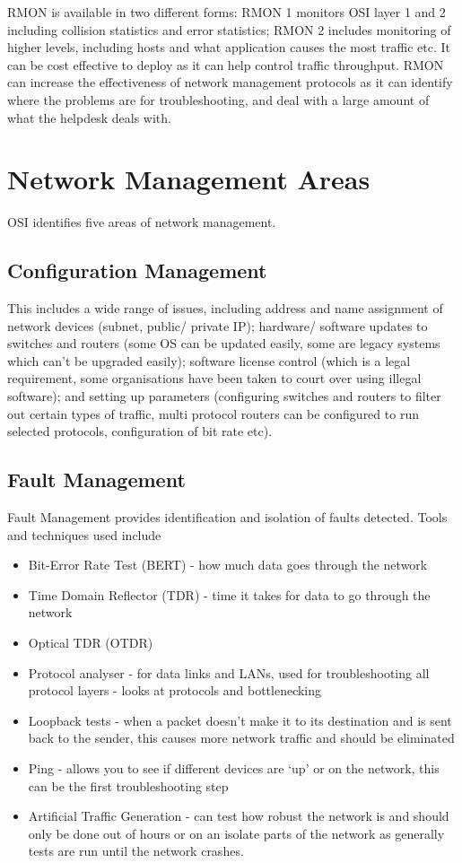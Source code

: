 RMON is available in two different forms: RMON 1 monitors OSI layer 1 and 2 including collision statistics and error statistics; RMON 2 includes monitoring of higher levels, including hosts and what application causes the most traffic etc. It can be cost effective to deploy as it can help control traffic throughput. RMON can increase the effectiveness of network management protocols as it can identify where the problems are for troubleshooting, and deal with a large amount of what the helpdesk deals with. 

\section*{Network Management Areas}
OSI identifies five areas of network management.
\subsection*{Configuration Management}
This includes a wide range of issues, including address and name assignment of network devices (subnet, public/ private IP); hardware/ software updates to switches and routers (some OS can be updated easily, some are legacy systems which can't be upgraded easily); software license control (which is a legal requirement, some organisations have been taken to court over using illegal software); and setting up parameters (configuring switches and routers to filter out certain types of traffic, multi protocol routers can be configured to run selected protocols, configuration of bit rate etc).

\subsection*{Fault Management}
Fault Management provides identification and isolation of faults detected. Tools and techniques used include
\begin{itemize}
    \item Bit-Error Rate Test (BERT) - how much data goes through the network
    \item Time Domain Reflector (TDR) - time it takes for data to go through the network
    \item Optical TDR (OTDR)
    \item Protocol analyser - for data links and LANs, used for troubleshooting all protocol layers - looks at protocols and bottlenecking
    \item Loopback tests - when a packet doesn't make it to its destination and is sent back to the sender, this causes more network traffic and should be eliminated
    \item Ping - allows you to see if different devices are `up' or on the network, this can be the first troubleshooting step
    \item Artificial Traffic Generation - can test how robust the network is and should only be done out of hours or on an isolate parts of the network as generally tests are run until the network crashes.
\end{itemize}
